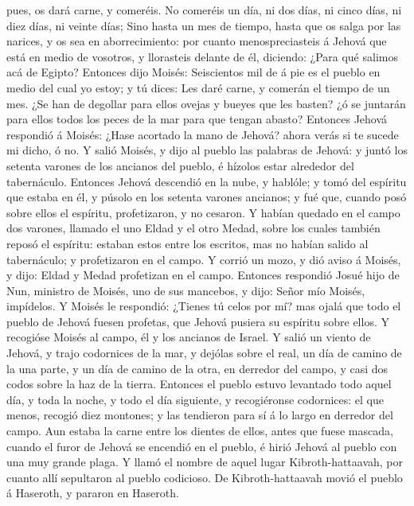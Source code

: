 pues, os dará carne, y comeréis.  No comeréis un día, ni
dos días, ni cinco días, ni diez días, ni veinte días; 
Sino hasta un mes de tiempo, hasta que os salga por las narices, y os
sea en aborrecimiento: por cuanto menospreciasteis á Jehová que está en
medio de vosotros, y llorasteis delante de él, diciendo: ¿Para qué
salimos acá de Egipto?  Entonces dijo Moisés: Seiscientos
mil de á pie es el pueblo en medio del cual yo estoy; y tú dices: Les
daré carne, y comerán el tiempo de un mes.  ¿Se han de
degollar para ellos ovejas y bueyes que les basten? ¿ó se juntarán para
ellos todos los peces de la mar para que tengan abasto? 
Entonces Jehová respondió á Moisés: ¿Hase acortado la mano de Jehová?
ahora verás si te sucede mi dicho, ó no.  Y salió Moisés,
y dijo al pueblo las palabras de Jehová: y juntó los setenta varones de
los ancianos del pueblo, é hízolos estar alrededor del tabernáculo.
 Entonces Jehová descendió en la nube, y hablóle; y tomó
del espíritu que estaba en él, y púsolo en los setenta varones ancianos;
y fué que, cuando posó sobre ellos el espíritu, profetizaron, y no
cesaron.  Y habían quedado en el campo dos varones,
llamado el uno Eldad y el otro Medad, sobre los cuales también reposó el
espíritu: estaban estos entre los escritos, mas no habían salido al
tabernáculo; y profetizaron en el campo.  Y corrió un
mozo, y dió aviso á Moisés, y dijo: Eldad y Medad profetizan en el
campo.  Entonces respondió Josué hijo de Nun, ministro de
Moisés, uno de sus mancebos, y dijo: Señor mío Moisés, impídelos.
 Y Moisés le respondió: ¿Tienes tú celos por mí? mas
ojalá que todo el pueblo de Jehová fuesen profetas, que Jehová pusiera
su espíritu sobre ellos.  Y recogióse Moisés al campo, él
y los ancianos de Israel.  Y salió un viento de Jehová, y
trajo codornices de la mar, y dejólas sobre el real, un día de camino de
la una parte, y un día de camino de la otra, en derredor del campo, y
casi dos codos sobre la haz de la tierra.  Entonces el
pueblo estuvo levantado todo aquel día, y toda la noche, y todo el día
siguiente, y recogiéronse codornices: el que menos, recogió diez
montones; y las tendieron para sí á lo largo en derredor del campo.
 Aun estaba la carne entre los dientes de ellos, antes
que fuese mascada, cuando el furor de Jehová se encendió en el pueblo, é
hirió Jehová al pueblo con una muy grande plaga.  Y llamó
el nombre de aquel lugar Kibroth-hattaavah, por cuanto allí sepultaron
al pueblo codicioso.  De Kibroth-hattaavah movió el
pueblo á Haseroth, y pararon en Haseroth.

